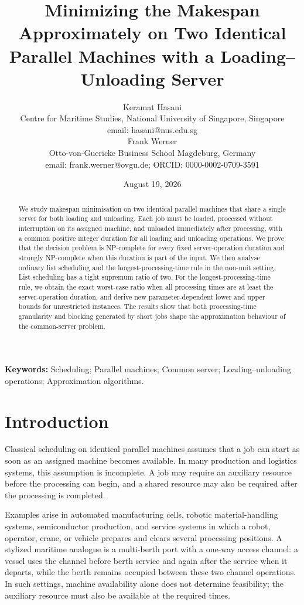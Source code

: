 \documentclass[11pt]{article}
\title{Minimizing the Makespan Approximately on Two Identical Parallel Machines with a Loading--Unloading Server}
\author{%
Keramat Hasani  \\[1ex]
Centre for Maritime Studies, National University of Singapore, Singapore  \\[1ex]
email: hasani@nus.edu.sg  \\[3ex]
  Frank Werner  \\[1ex]
Otto-von-Guericke Business School Magdeburg, Germany \\[1ex]
  email: frank.werner@ovgu.de; ORCID: 0000-0002-0709-3591
}
\date{August 19, 2026}
\begin{document}
\maketitle

\begin{abstract}
We study makespan minimisation on two identical parallel machines that share a
single server for both loading and unloading. Each job must be loaded, processed
without interruption on its assigned machine, and unloaded immediately after
processing, with a common positive integer duration for all loading and unloading
operations. We prove that the decision problem is NP-complete for every fixed
server-operation duration and strongly NP-complete when this duration is part of
the input. We then analyse ordinary list scheduling and the longest-processing-time
rule in the non-unit setting. List scheduling has a tight supremum ratio of two.
For the longest-processing-time rule, we obtain the exact worst-case ratio when
all processing times are at least the server-operation duration, and derive new
parameter-dependent lower and upper bounds for unrestricted instances. The results
show that both processing-time granularity and blocking generated by short jobs
shape the approximation behaviour of the common-server problem.
\end{abstract}
\noindent\textbf{Keywords:} Scheduling; Parallel machines; Common server;
Loading--unloading operations; Approximation algorithms.

\vspace{1em}

\section{Introduction}
\label{sec:introduction}

Classical scheduling on identical parallel machines assumes that a job can start as
soon as an assigned machine becomes available. In many production and logistics
systems, this assumption is incomplete. A job may require an auxiliary resource
before the processing can begin, and a shared resource may also be required after
the processing is completed. 

Examples arise in automated manufacturing cells, robotic material-handling systems,
semiconductor production, and service systems in which a robot, operator, crane, or
vehicle prepares and clears several processing positions. A stylized maritime analogue
is a multi-berth port with a one-way access channel: a vessel uses the channel before
berth service and again after the service when it departs, while the berth remains occupied
between these two channel operations. In such settings, machine availability alone does
not determine feasibility; the auxiliary resource must also be available at the required
times.
\end{document}
